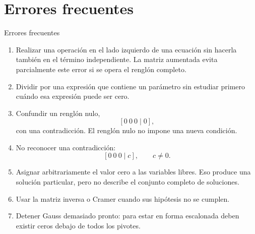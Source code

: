 \documentclass[aspectratio=169,9pt]{beamer}
\theoremstyle{remark}
\begin{document}
\section{Errores frecuentes}
\begin{frame}[allowframebreaks,t]{Errores frecuentes}
\begin{enumerate}
\item Realizar una operación en el lado izquierdo de una ecuación sin hacerla también en el término
independiente. La matriz aumentada evita parcialmente este error si se opera el renglón completo.
\item Dividir por una expresión que contiene un parámetro sin estudiar primero cuándo esa expresión
puede ser cero.
\item Confundir un renglón nulo,
\[
[0\ 0\ 0\mid0],
\]
con una contradicción. El renglón nulo no impone una nueva condición.
\item No reconocer una contradicción:
\[
[0\ 0\ 0\mid c],\qquad c\neq0.
\]
\item Asignar arbitrariamente el valor cero a las variables libres. Eso produce una solución particular,
pero no describe el conjunto completo de soluciones.
\item Usar la matriz inversa o Cramer cuando sus hipótesis no se cumplen.
\item Detener Gauss demasiado pronto: para estar en forma escalonada deben existir ceros debajo de
todos los pivotes.
\end{enumerate}
\end{frame}
\end{document}
